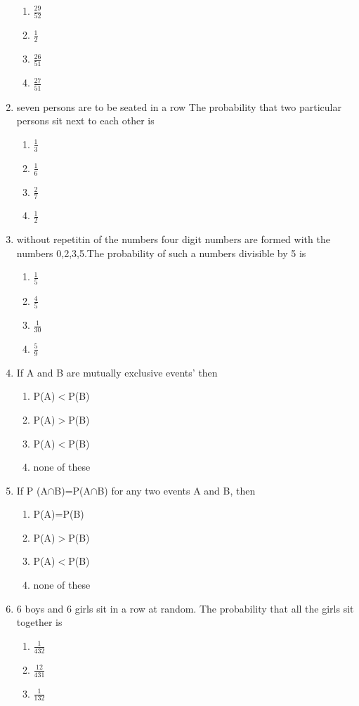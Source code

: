 \documentclass[12pt]{article}
\begin{document}
\begin{enumerate}
\begin{enumerate}
\item $\frac{29}{52}$
\item $\frac{1}{2}$
\item $\frac{26}{51}$
\item $\frac{27}{51}$
\end{enumerate}
\item seven persons are to be seated in a row The probability that two particular persons sit next to each other is
\begin{enumerate}
\item $\frac{1}{3}$
\item $\frac{1}{6}$
\item $\frac{2}{7}$
\item $\frac{1}{2}$
\end{enumerate}
\item without repetitin of the numbers four digit numbers are  formed with the numbers 0,2,3,5.The probability of such a numbers divisible by 5 is
\begin{enumerate}
\item $\frac{1}{5}$
\item $\frac{4}{5}$
\item $\frac{1}{30}$
\item $\frac{5}{9}$
\end{enumerate}
\item If A and B are mutually exclusive events' then
\begin{enumerate}
\item P(A)$<$P(B)
\item P(A)$>$P(B)
\item P(A)$<$P(B)
\item none of these
\end{enumerate}
\item If P (A$\cap$B)=P(A$\cap$B) for any two events A and B, then 
\begin{enumerate}
\item P(A)=P(B)
\item P(A)$>$P(B)
\item P(A)$<$P(B)
\item none of these
\end{enumerate}
\item 6 boys and 6 girls sit in a row at random. The probability that all the girls sit together is
\begin{enumerate}
\item $\frac{1}{432}$
\item $\frac{12}{431}$
\item $\frac{1}{132}$

\end{enumerate}
\end{enumerate}
\end{document}
